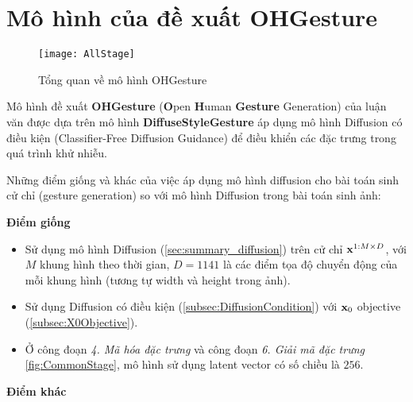 \pagebreak

\section{Mô hình của đề xuất OHGesture}
\label{sec:ohgesture}

\begin{figure}[H]
	\centering
		\texttt{[image: AllStage]}
	\caption{Tổng quan về mô hình OHGesture}
	\label{fig:TrainingAndSampling}
\end{figure}

Mô hình đề xuất \textbf{OHGesture} (\textbf{O}pen \textbf{H}uman \textbf{Gesture} Generation) của luận văn được dựa trên mô hình \textbf{DiffuseStyleGesture} \cite{yang2023diffusestylegesture} áp dụng mô hình Diffusion \cite{ho2020denoising} có điều kiện \cite{ho2022classifier} (Classifier-Free Diffusion Guidance) để điều khiển các đặc trưng trong quá trình khử nhiễu.

Những điểm giống và khác của việc áp dụng mô hình diffusion cho bài toán sinh cử chỉ (gesture generation) so với mô hình Diffusion trong bài toán sinh ảnh:

\vspace{10pt}

\textbf{Điểm giống}
\begin{itemize}
	\item Sử dụng mô hình Diffusion (\autoref{sec:summary_diffusion}) trên cử chỉ $\mathbf{x}^{1:M \times D}$,  với $M$ khung hình theo thời gian, $D=1141$ là các điểm tọa độ chuyển động của mỗi khung hình (tương tự width và height trong ảnh).
	\item Sử dụng Diffusion có điều kiện (\autoref{subsec:DiffusionCondition}) với $\mathbf{x}_0$ objective (\autoref{subsec:X0Objective}).
	\item Ở công đoạn \textit{4. Mã hóa đặc trưng} và công đoạn \textit{6. Giải mã đặc trưng} \autoref{fig:CommonStage}, mô hình sử dụng latent vector có số chiều là $256$.
\end{itemize}

\textbf{Điểm khác}

